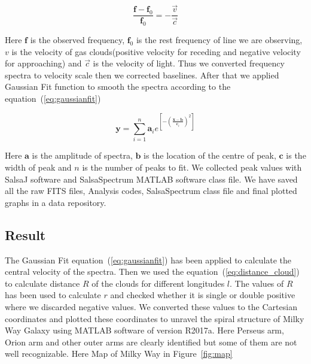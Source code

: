 \documentclass[10pt,conference]{IEEEtran}
\begin{document}
\begin{equation}
 \frac{\mathbf{f}-\mathbf{f}_{0}}{\mathbf{f}_{0}}=-\frac{\vec{v}}{\vec{c}}
 \label{eq:doppler}
\end{equation}

Here $\mathbf{f}$ is the observed frequency, $\mathbf{f}_{0}$ is the rest frequency of line we are observing, $\mathbf{\mathit{v}}$ is the velocity of gas clouds(positive velocity for receding and negative velocity for approaching) and $\vec{c}$ is the velocity of light. Thus we converted frequency spectra to velocity scale then we corrected baselines. After that we applied Gaussian Fit function to smooth the spectra according to the equation~(\ref{eq:gaussianfit})

\begin{equation}
  \mathbf{y}=\sum^n_{i=1}\mathbf{a}_{i}e^{\left[-\left(\frac{\mathbf{x}-\mathbf{b}}{\mathbf{c}_{i}} \right)^{2}\right]}
  \label{eq:gaussianfit}
\end{equation}

Here $\mathbf{a}$ is the amplitude of spectra, $\mathbf{b}$ is the location of the centre of peak, $\mathbf{c}$ is the width of peak and $n$ is the number of peaks to fit\cite{CathyHorellou2015}. We collected peak values with SalsaJ software and SalsaSpectrum\cite{DanielDahlin2015} MATLAB software class file. We have saved all the raw FITS files, Analysis codes, SalsaSpectrum class file and final plotted graphs in a data repository\cite{Hossain2018}.

\subsection{Result}

The Gaussian Fit equation~(\ref{eq:gaussianfit}) has been applied to calculate the central velocity of the spectra. Then we used the equation~(\ref{eq:distance_cloud}) to calculate distance $\mathit{R}$ of the clouds for different longitudes $\mathit{l}$. The values of $\mathit{R}$ has been used to calculate $\mathit{r}$ and checked whether it is single or double positive where we discarded negative values\cite{ThomasBensby2017,santo2013mapping}. We converted these values to the Cartesian coordinates and plotted these coordinates to unravel the spiral structure of Milky Way Galaxy using MATLAB software of version R2017a. Here Perseus arm, Orion arm and other outer arms are clearly identified but some of them are not well recognizable. Here Map of Milky Way in Figure~\ref{fig:map}
\end{document}
